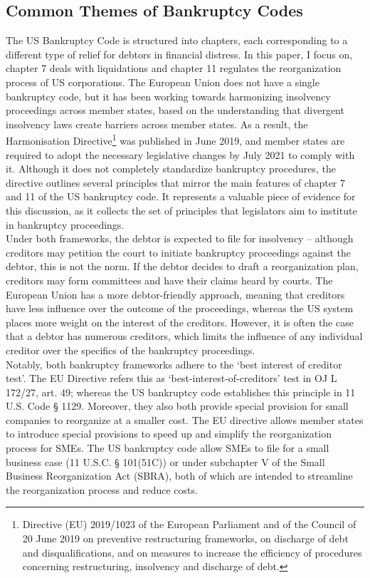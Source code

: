\documentclass[12pt]{article}
\begin{document}
\subsection{Common Themes of Bankruptcy Codes}
The US Bankruptcy Code is structured into chapters, each corresponding to a different type of relief for debtors in financial distress. In this paper, I focus on, chapter 7 deals with liquidations and chapter 11 regulates the reorganization process of US corporations. The European Union does not have a single bankruptcy code, but it has been working towards harmonizing insolvency proceedings across member states, based on the understanding that divergent insolvency laws create barriers across member states. As a result, the Harmonisation Directive\footnote{Directive (EU) 2019/1023 of the European Parliament and of the Council of 20 June 2019 on preventive restructuring frameworks, on discharge of debt and disqualifications, and on measures to increase the efficiency of procedures concerning restructuring, insolvency and discharge of debt.}  was published in June 2019, and member states are required to adopt the necessary legislative changes by July 2021 to comply with it. Although it does not completely standardize bankruptcy procedures, the directive outlines several principles that mirror the main features of chapter 7 and 11 of the US bankruptcy code. It represents a valuable piece of evidence for this discussion, as it collects the set of principles that legislators aim to institute in bankruptcy proceedings. \vspace{3mm} \\
Under both frameworks, the debtor is expected to file for insolvency – although creditors may petition the court to initiate bankruptcy proceedings against the debtor, this is not the norm. If the debtor decides to draft a reorganization plan, creditors may form committees and have their claims heard by courts. The European Union has a more debtor-friendly approach, meaning that creditors have less influence over the outcome of the proceedings, whereas the US system places more weight on the interest of the creditors. However, it is often the case that a debtor has numerous creditors, which limits the influence of any individual creditor over the specifics of the bankruptcy proceedings. 
\vspace{3mm} \\
Notably, both bankruptcy frameworks adhere to the `best interest of creditor test'. The EU Directive refers this as ‘best-interest-of-creditors’ test in OJ L 172/27, art. 49; whereas the US bankruptcy code establishes this principle in 11 U.S. Code § 1129. Moreover, they also both provide special provision for small companies to reorganize at a smaller cost. The EU directive allows member states to introduce special provisions to speed up and simplify the reorganization process for SMEs. The US bankruptcy code allow SMEs to file for a small business case (11 U.S.C. § 101(51C)) or under subchapter V of the Small Business Reorganization Act (SBRA), both of which are intended to streamline the reorganization process and reduce costs.
\end{document}
